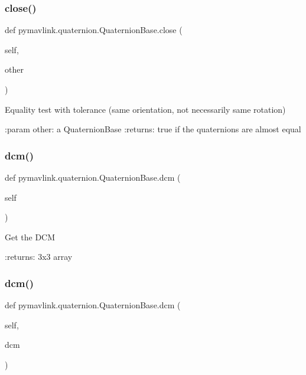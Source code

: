 \subsubsection{\texorpdfstring{close()}{close()}}
{\footnotesize\ttfamily def pymavlink.\+quaternion.\+Quaternion\+Base.\+close (\begin{DoxyParamCaption}\item[{}]{self,  }\item[{}]{other }\end{DoxyParamCaption})}

\begin{DoxyVerb}Equality test with tolerance
(same orientation, not necessarily same rotation)


:param other: a QuaternionBase
:returns: true if the quaternions are almost equal
\end{DoxyVerb}
 \mbox{\label{classpymavlink_1_1quaternion_1_1QuaternionBase_a534fc3e09f0c3b65e8fe5105d39e4891}} 
\subsubsection{\texorpdfstring{dcm()}{dcm()}\hspace{0.1cm}{\footnotesize\ttfamily [1/2]}}
{\footnotesize\ttfamily def pymavlink.\+quaternion.\+Quaternion\+Base.\+dcm (\begin{DoxyParamCaption}\item[{}]{self }\end{DoxyParamCaption})}

\begin{DoxyVerb}Get the DCM

:returns: 3x3 array
\end{DoxyVerb}
 \mbox{\label{classpymavlink_1_1quaternion_1_1QuaternionBase_a2da4adc7fb783fe3d4e3c4d92f3ac91e}} 
\subsubsection{\texorpdfstring{dcm()}{dcm()}\hspace{0.1cm}{\footnotesize\ttfamily [2/2]}}
{\footnotesize\ttfamily def pymavlink.\+quaternion.\+Quaternion\+Base.\+dcm (\begin{DoxyParamCaption}\item[{}]{self,  }\item[{}]{dcm }\end{DoxyParamCaption})}

